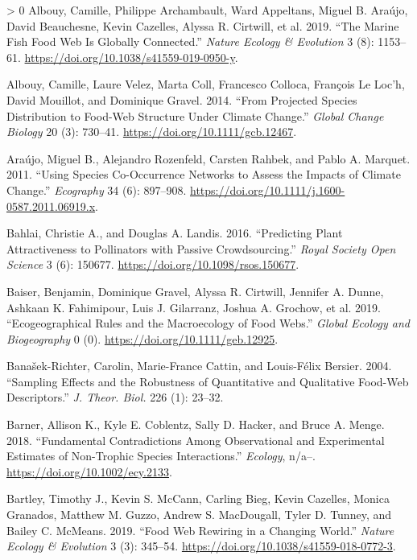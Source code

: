 \documentclass[10pt,oneside]{article}
\newlength{\cslhangindent}
\newenvironment{CSLReferences}[3] %
 {%
  \setlength{\parindent}{0pt}
  \ifodd #1 \everypar{\setlength{\hangindent}{\cslhangindent}}\ignorespaces\fi
  \ifnum #2 > 0
  \setlength{\parskip}{#2\baselineskip}
  \fi
 }%
 {}
\begin{document}
\hypertarget{refs}{}
\begin{CSLReferences}{1}{0}
\leavevmode\hypertarget{ref-Albouy2019MarFis}{}%
Albouy, Camille, Philippe Archambault, Ward Appeltans, Miguel B. Araújo,
David Beauchesne, Kevin Cazelles, Alyssa R. Cirtwill, et al. 2019.
{``The Marine Fish Food Web Is Globally Connected.''} \emph{Nature
Ecology \& Evolution} 3 (8): 1153--61.
\url{https://doi.org/10.1038/s41559-019-0950-y}.

\leavevmode\hypertarget{ref-Albouy2014ProSpe}{}%
Albouy, Camille, Laure Velez, Marta Coll, Francesco Colloca, François Le
Loc'h, David Mouillot, and Dominique Gravel. 2014. {``From Projected
Species Distribution to Food-Web Structure Under Climate Change.''}
\emph{Global Change Biology} 20 (3): 730--41.
\url{https://doi.org/10.1111/gcb.12467}.

\leavevmode\hypertarget{ref-Araujo2011UsiSpe}{}%
Araújo, Miguel B., Alejandro Rozenfeld, Carsten Rahbek, and Pablo A.
Marquet. 2011. {``Using Species Co-Occurrence Networks to Assess the
Impacts of Climate Change.''} \emph{Ecography} 34 (6): 897--908.
\url{https://doi.org/10.1111/j.1600-0587.2011.06919.x}.

\leavevmode\hypertarget{ref-Bahlai2016PrePla}{}%
Bahlai, Christie A., and Douglas A. Landis. 2016. {``Predicting Plant
Attractiveness to Pollinators with Passive Crowdsourcing.''} \emph{Royal
Society Open Science} 3 (6): 150677.
\url{https://doi.org/10.1098/rsos.150677}.

\leavevmode\hypertarget{ref-Baiser2019EcoRul}{}%
Baiser, Benjamin, Dominique Gravel, Alyssa R. Cirtwill, Jennifer A.
Dunne, Ashkaan K. Fahimipour, Luis J. Gilarranz, Joshua A. Grochow, et
al. 2019. {``Ecogeographical Rules and the Macroecology of Food Webs.''}
\emph{Global Ecology and Biogeography} 0 (0).
\url{https://doi.org/10.1111/geb.12925}.

\leavevmode\hypertarget{ref-Banasek-Richter2004SamEff}{}%
Banašek-Richter, Carolin, Marie-France Cattin, and Louis-Félix Bersier.
2004. {``Sampling Effects and the Robustness of Quantitative and
Qualitative Food-Web Descriptors.''} \emph{J. Theor. Biol.} 226 (1):
23--32.

\leavevmode\hypertarget{ref-Barner2018FunCon}{}%
Barner, Allison K., Kyle E. Coblentz, Sally D. Hacker, and Bruce A.
Menge. 2018. {``Fundamental Contradictions Among Observational and
Experimental Estimates of Non-Trophic Species Interactions.''}
\emph{Ecology}, n/a--. \url{https://doi.org/10.1002/ecy.2133}.

\leavevmode\hypertarget{ref-Bartley2019FooWeb}{}%
Bartley, Timothy J., Kevin S. McCann, Carling Bieg, Kevin Cazelles,
Monica Granados, Matthew M. Guzzo, Andrew S. MacDougall, Tyler D.
Tunney, and Bailey C. McMeans. 2019. {``Food Web Rewiring in a Changing
World.''} \emph{Nature Ecology \& Evolution} 3 (3): 345--54.
\url{https://doi.org/10.1038/s41559-018-0772-3}.


\end{CSLReferences}
\end{document}

